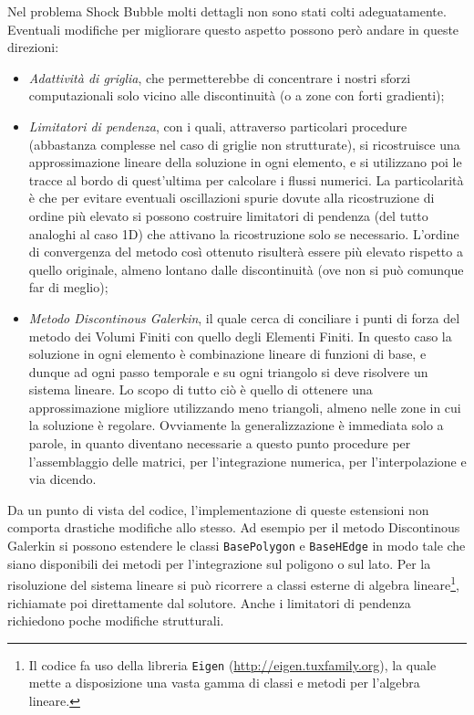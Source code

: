 Nel problema Shock Bubble molti dettagli non sono stati colti adeguatamente. Eventuali modifiche per migliorare questo aspetto possono però andare in queste direzioni:
\begin{itemize}
\item \emph{Adattività di griglia}, che permetterebbe di concentrare i nostri sforzi computazionali solo vicino alle discontinuità (o a zone con forti gradienti);
\item \emph{Limitatori di pendenza}, con i quali, attraverso particolari procedure (abbastanza complesse nel caso di griglie non strutturate), si ricostruisce una approssimazione lineare della soluzione in ogni elemento, e si utilizzano poi le tracce al bordo di quest'ultima per calcolare i flussi numerici. La particolarità è che per evitare eventuali oscillazioni spurie dovute alla ricostruzione di ordine più elevato si possono costruire limitatori di pendenza (del tutto analoghi al caso 1D) che attivano la ricostruzione solo se necessario. L'ordine di convergenza del metodo così ottenuto risulterà essere più elevato rispetto a quello originale, almeno lontano dalle discontinuità (ove non si può comunque far di meglio);
\item \emph{Metodo Discontinous Galerkin}, il quale cerca di conciliare i punti di forza del metodo dei Volumi Finiti con quello degli Elementi Finiti. In questo caso la soluzione in ogni elemento è combinazione lineare di funzioni di base, e dunque ad ogni passo temporale e su ogni triangolo si deve risolvere un sistema lineare. Lo scopo di tutto ciò è quello di ottenere una approssimazione migliore utilizzando meno triangoli, almeno nelle zone in cui la soluzione è regolare. Ovviamente la generalizzazione è immediata solo a parole, in quanto diventano necessarie a questo punto procedure per l'assemblaggio delle matrici, per l'integrazione numerica, per l'interpolazione e via dicendo.
\end{itemize}

Da un punto di vista del codice, l'implementazione di queste estensioni non comporta drastiche modifiche allo stesso. Ad esempio per il metodo Discontinous Galerkin si possono estendere le classi \texttt{BasePolygon} e \texttt{BaseHEdge} in modo tale che siano disponibili dei metodi per l'integrazione sul poligono o sul lato. Per la risoluzione del sistema lineare si può ricorrere a classi esterne di algebra lineare\footnote{Il codice fa uso della libreria \texttt{Eigen} (\url{http://eigen.tuxfamily.org}), la quale mette a disposizione una vasta gamma di classi e metodi per l'algebra lineare.}, richiamate poi direttamente dal solutore. Anche i limitatori di pendenza richiedono poche modifiche strutturali.

